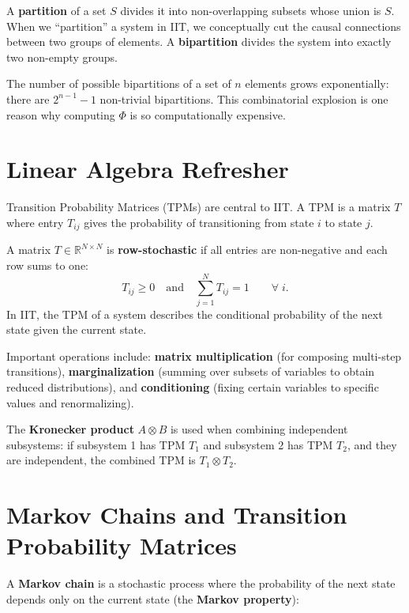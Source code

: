 \documentclass[11pt,a4paper]{report}
\newcommand{\Phi}{\varPhi}
\begin{document}
A \textbf{partition} of a set $S$ divides it into non-overlapping subsets whose union is $S$. When we ``partition'' a system in IIT, we conceptually cut the causal connections between two groups of elements. A \textbf{bipartition} divides the system into exactly two non-empty groups.

The number of possible bipartitions of a set of $n$ elements grows exponentially: there are $2^{n-1} - 1$ non-trivial bipartitions. This combinatorial explosion is one reason why computing $\Phi$ is so computationally expensive.

\section{Linear Algebra Refresher}

Transition Probability Matrices (TPMs) are central to IIT. A TPM is a matrix $T$ where entry $T_{ij}$ gives the probability of transitioning from state $i$ to state $j$.

\begin{definitionbox}
A matrix $T \in \mathbb{R}^{N \times N}$ is \textbf{row-stochastic} if all entries are non-negative and each row sums to one:
\[
  T_{ij} \geq 0 \quad\text{and}\quad \sum_{j=1}^{N} T_{ij} = 1 \qquad \forall\; i.
\]
In IIT, the TPM of a system describes the conditional probability of the next state given the current state.
\end{definitionbox}

Important operations include: \textbf{matrix multiplication} (for composing multi-step transitions), \textbf{marginalization} (summing over subsets of variables to obtain reduced distributions), and \textbf{conditioning} (fixing certain variables to specific values and renormalizing).

The \textbf{Kronecker product} $A \otimes B$ is used when combining independent subsystems: if subsystem 1 has TPM $T_1$ and subsystem 2 has TPM $T_2$, and they are independent, the combined TPM is $T_1 \otimes T_2$.

\section{Markov Chains and Transition Probability Matrices}

A \textbf{Markov chain} is a stochastic process where the probability of the next state depends only on the current state (the \textbf{Markov property}):
\end{document}
